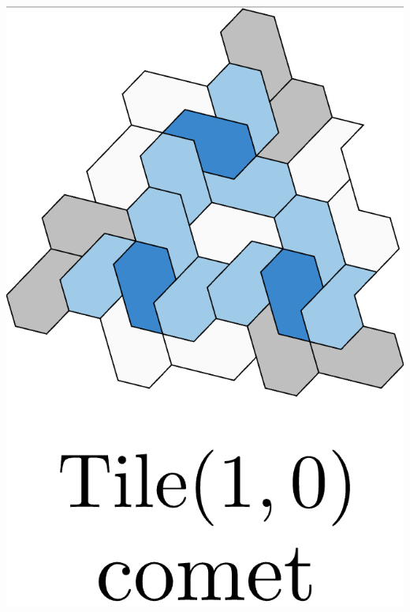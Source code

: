 \documentclass[class=beamer, crop=false]{standalone}
\begin{document}
\begin{minipage}{0.24\textwidth}
\begin{minipage}[t]{0.24\textwidth}
    \includegraphics[width=\linewidth]{images/polykite-family/comet(1,0).png}
  \end{minipage}
\end{minipage}
\end{document}
